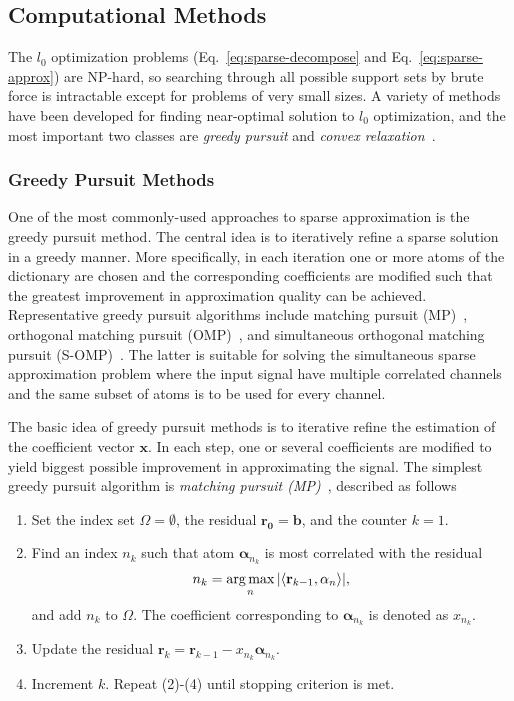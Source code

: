 \subsection{Computational Methods}
The $l_0$ optimization problems (Eq.~\ref{eq:sparse-decompose} and Eq.~\ref{eq:sparse-approx})
are NP-hard, so searching through all possible support sets by brute force is intractable except
for problems of very small sizes. A variety of methods have been developed for finding near-optimal
solution to $l_0$ optimization, and the most important two classes are \emph{greedy pursuit}
and \emph{convex relaxation}~\cite{Tropp2010}.

\subsubsection*{Greedy Pursuit Methods}
One of the most commonly-used approaches to sparse approximation is
the greedy pursuit method. The central idea is to iteratively refine a
sparse solution in a greedy manner. More specifically, in each
iteration one or more atoms of the dictionary are chosen
and the corresponding coefficients are modified
such that the greatest improvement in approximation quality can be achieved.
Representative greedy pursuit algorithms include matching pursuit
(MP)~\cite{Mallat1993}, orthogonal matching pursuit
(OMP)~\cite{Pati1993}, and simultaneous orthogonal matching pursuit (S-OMP)~\cite{Tropp2006a}.
The latter is suitable for solving the simultaneous sparse approximation problem where
the input signal have multiple correlated channels and the same subset of atoms is to be used
for every channel.


The basic idea of greedy pursuit methods is to iterative refine the estimation of the coefficient vector
$\mathbf{x}$. In each step, one or several coefficients are modified to yield biggest possible improvement
in approximating the signal. The simplest greedy pursuit algorithm is \emph{matching pursuit (MP)}~\cite{Mallat1993},
described as follows
\begin{enumerate}
\item Set the index set $\Omega=\emptyset$, the residual $\mathbf{r_0} = \mathbf{b}$, and the counter $k=1$.
\item Find an index $n_k$ such that atom $\mathbf{\alpha}_{n_k}$ is most correlated with the residual
\begin{equation*}
n_k = \operatorname*{arg\,max}_n |\langle \mathbf{r}_{k-1},\mathbf{\alpha}_{n} \rangle|,
\end{equation*}
and add $n_k$ to $\Omega$. The coefficient corresponding to $\mathbf{\alpha}_{n_k}$ is denoted as $x_{n_k}$.

\item Update the residual $\mathbf{r}_k = \mathbf{r}_{k-1} - x_{n_k} \mathbf{\alpha}_{n_k}$.
\item Increment $k$. Repeat (2)-(4) until stopping criterion is met.
\end{enumerate}

